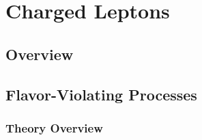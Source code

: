%

\chapter{Charged Leptons}
\label{chap:charged-leptons}


\begin{center}\begin{boldmath}






\end{boldmath}\end{center}

\makeatletter
\renewcommand{\paragraph}{\@startsection{paragraph}{4}{0ex}%
   {-3.25ex plus -1ex minus -0.2ex}%
   {1.5ex plus 0.2ex}%
   {\normalfont\normalsize\bfseries}}
\makeatother



\tableofcontents

\section{Overview}\label{sec:cl:over}


\section{Flavor-Violating Processes}\label{sec:cl:fv}


\subsection{Theory Overview}\label{sec:cl:fvt}


